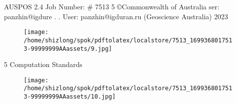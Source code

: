 \documentclass[a4paper,12pt]{article}
\begin{document}
\vspace{10pt}

         AUSPOS 2.4 Job Number: \# 7513 5 ©Commonwealth of Australia    ser: panzhin@igdure . .  User: panzhin@igduran.ru (Geoscience Australia) 2023 

\vspace{10pt}

\par

\vspace{10pt}

\begin{figure}[h]

\texttt{[image: /home/shizlong/spok/pdftolatex/localstore/7513\_1699368017513-99999999AAassets/9.jpg]}

\centering

\end{figure}

    5 Computation Standards 

\vspace{10pt}

\begin{figure}[h]

\texttt{[image: /home/shizlong/spok/pdftolatex/localstore/7513\_1699368017513-99999999AAassets/10.jpg]}

\centering

\end{figure}
\end{document}

